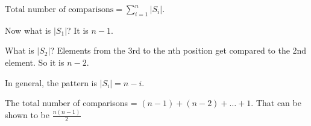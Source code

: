 \documentclass[12pt]{article}
\begin{document}
\begin{enumerate}
$\displaystyle \text{Total number of comparisons} = \sum_{i=1}^n |S_i|$.

Now what is $|S_1|$? It is $n-1$.

What is $|S_2|$? Elements from the 3rd to the nth position get compared to the 2nd element. So it is $n-2$.

In general, the pattern is $|S_i| = n-i$. 

The total number of comparisons = $(n - 1 )+ (n-2) + \ldots + 1$. That can be shown to be $\frac{n(n-1)}{2}$

\end{enumerate}
\end{document}
